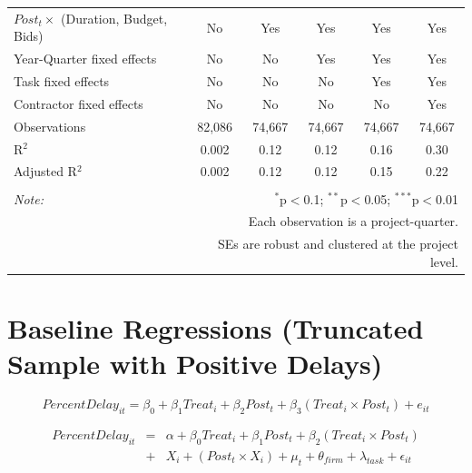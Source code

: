 \documentclass[
]{article}
\begin{document}
\begin{table}[H]
\begin{tabular}{@{\extracolsep{-2pt}}lccccc}
$Post_t \times$  (Duration, Budget, Bids) & No & Yes & Yes & Yes & Yes \\ 
Year-Quarter fixed effects & No & No & Yes & Yes & Yes \\ 
Task fixed effects & No & No & No & Yes & Yes \\ 
Contractor fixed effects & No & No & No & No & Yes \\ 
Observations & 82,086 & 74,667 & 74,667 & 74,667 & 74,667 \\ 
R$^{2}$ & 0.002 & 0.12 & 0.12 & 0.16 & 0.30 \\ 
Adjusted R$^{2}$ & 0.002 & 0.12 & 0.12 & 0.15 & 0.22 \\ 
\hline 
\hline \\[-1.8ex] 
\textit{Note:}  & \multicolumn{5}{r}{$^{*}$p$<$0.1; $^{**}$p$<$0.05; $^{***}$p$<$0.01} \\ 
 & \multicolumn{5}{r}{Each observation is a project-quarter.} \\ 
 & \multicolumn{5}{r}{SEs are robust and clustered at the project level.} \\ 
\end{tabular} 
\end{table}

\hypertarget{baseline-regressions-truncated-sample-with-positive-delays}{%
\section{Baseline Regressions (Truncated Sample with Positive
Delays)}\label{baseline-regressions-truncated-sample-with-positive-delays}}

\[ PercentDelay_{it} = \beta_0 + \beta_1 Treat_i + \beta_2 Post_t + \beta_3 (Treat_i \times Post_t) + e_{it}\]

\[ \begin{aligned} PercentDelay_{it} &=& \alpha+\beta_0 Treat_i + \beta_1 Post_t + \beta_2 (Treat_i \times Post_t)\\
&+&  X_i + (Post_t \times X_i) + \mu_t + \theta_{firm} + \lambda_{task}+ \epsilon_{it}
\end{aligned}\]
\end{document}
